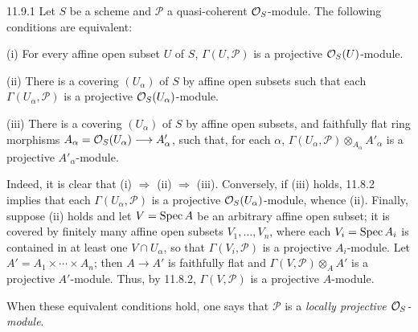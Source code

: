 \begin{definition}{11.9.1}\label{VIB.11.9.1}
Let $S$ be a scheme and $\mathscr P$ a quasi-coherent $\mathcal{O}_S$-module. The following conditions are equivalent:

(i) For every affine open subset $U$ of $S$, $\Gamma(U,\mathscr P)$ is a projective $\mathcal{O}_S(U)$-module.

(ii) There is a covering $(U_\alpha)$ of $S$ by affine open subsets such that each $\Gamma(U_\alpha,\mathscr P)$ is a projective $\mathcal{O}_S(U_\alpha)$-module.

(iii) There is a covering $(U_\alpha)$ of $S$ by affine open subsets, and faithfully flat ring morphisms $A_\alpha=\mathcal{O}_S(U_\alpha)\longrightarrow A'_\alpha$, such that, for each $\alpha$, $\Gamma(U_\alpha,\mathscr P)\otimes_{A_\alpha}A'_\alpha$ is a projective $A'_\alpha$-module.

Indeed, it is clear that (i) $\Rightarrow$ (ii) $\Rightarrow$ (iii). Conversely, if (iii) holds, 11.8.2 implies that each $\Gamma(U_\alpha,\mathscr P)$ is a projective $\mathcal{O}_S(U_\alpha)$-module, whence (ii). Finally, suppose (ii) holds and let $V=\operatorname{Spec} A$ be an arbitrary affine open subset; it is covered by finitely many affine open subsets $V_1,\ldots,V_n$, where each $V_i=\operatorname{Spec} A_i$ is contained in at least one $V\cap U_\alpha$, so that $\Gamma(V_i,\mathscr P)$ is a projective $A_i$-module. Let $A'=A_1\times\cdots\times A_n$; then $A\to A'$ is faithfully flat and $\Gamma(V,\mathscr P)\otimes_A A'$ is a projective $A'$-module. Thus, by 11.8.2, $\Gamma(V,\mathscr P)$ is a projective $A$-module.

When these equivalent conditions hold, one says that $\mathscr P$ is a \emph{locally projective $\mathcal{O}_S$-module}.
\end{definition}

